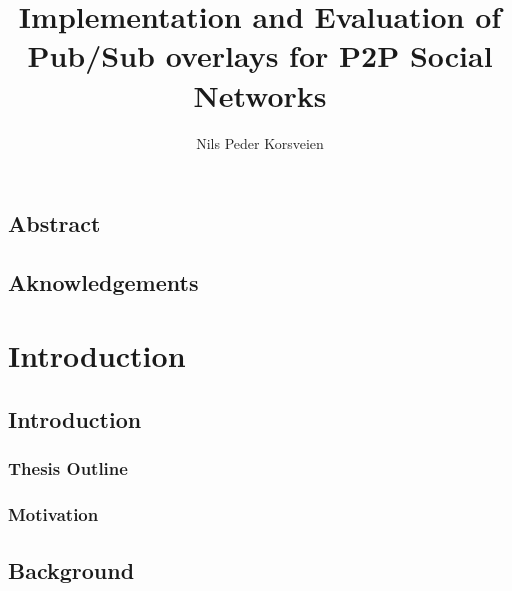 \documentclass[UKenglish, a4paper]{ifimaster}
\title{Implementation and Evaluation of Pub/Sub overlays for P2P Social Networks}
\subtitle{}
\author{Nils Peder Korsveien}
\begin{document}
\ififorside{}
\frontmatter{}
\maketitle{}

\chapter*{Abstract}
\tableofcontents{}
\listoffigures{}
\listoftables{}
\chapter*{Aknowledgements}
\mainmatter{}

\part{Introduction}

    \chapter{Introduction}
        \section{Thesis Outline}
        \section{Motivation}

    \chapter{Background}
    
\end{document}
